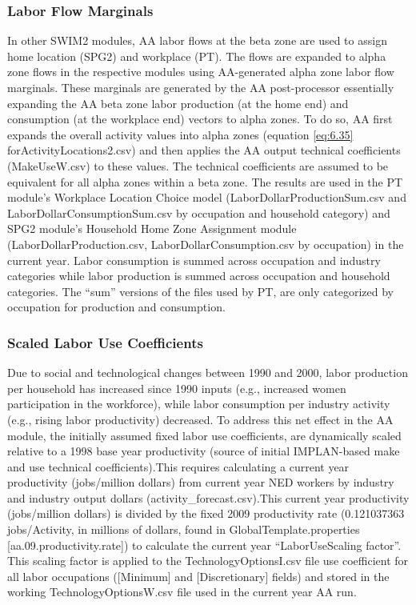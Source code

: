 \subsubsection{Labor Flow Marginals}
In other SWIM2 modules, AA labor flows at the beta zone are used to assign home location (SPG2) and workplace (PT). The flows are expanded to alpha zone flows in the respective modules using AA-generated alpha zone labor flow marginals. These marginals are generated by the AA post-processor essentially expanding the AA beta zone labor production (at the home end) and consumption (at the workplace end) vectors to alpha zones. To do so, AA first expands the overall activity values into alpha zones (equation \ref{eq:6.35} forActivityLocations2.csv) and then applies the AA output technical coefficients (MakeUseW.csv) to these values. The technical coefficients are assumed to be equivalent for all alpha zones within a beta zone. The results are used in the PT module's Workplace Location Choice model (LaborDollarProductionSum.csv and LaborDollarConsumptionSum.csv by occupation and household category) and SPG2 module's Household Home Zone Assignment module (LaborDollarProduction.csv, LaborDollarConsumption.csv by occupation) in the current year. Labor consumption is summed across occupation and industry categories while labor production is summed across occupation and household categories. The ``sum'' versions of the files used by PT, are only categorized by occupation for production and consumption.

\subsubsection{Scaled Labor Use Coefficients}
Due to social and technological changes between 1990 and 2000, labor production per household has increased since 1990 inputs (e.g., increased women participation in the workforce), while labor consumption per industry activity (e.g., rising labor productivity) decreased. To address this net effect in the AA module, the initially assumed fixed labor use coefficients, are dynamically scaled relative to a 1998 base year productivity (source of initial IMPLAN-based make and use technical coefficients).This requires calculating a current year productivity (jobs/million dollars) from current year NED workers by industry and industry output dollars (activity\_forecast.csv).This current year productivity (jobs/million dollars) is divided by the fixed 2009 productivity rate (0.121037363 jobs/Activity, in millions of dollars, found in GlobalTemplate.properties [aa.09.productivity.rate]) to calculate the current year ``LaborUseScaling factor''. This scaling factor is applied to the TechnologyOptionsI.csv file use coefficient for all labor occupations ([Minimum] and [Discretionary] fields) and stored in the working TechnologyOptionsW.csv file used in the current year AA run. 

